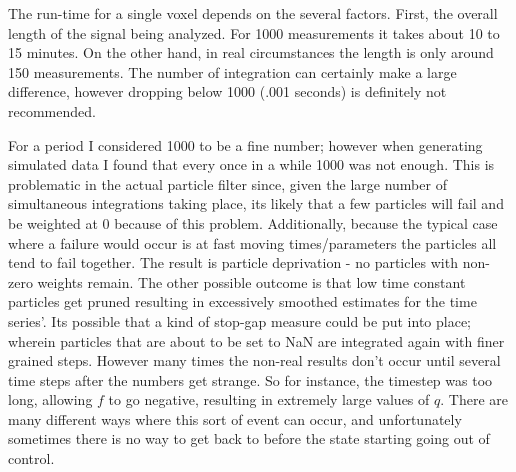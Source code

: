 The run-time for a single voxel depends on the several factors. First, the
overall length of the signal being analyzed. For 1000 measurements it takes
about 10 to 15 minutes. On the other hand, in real circumstances the
length is only around 150 measurements. The number of  integration
can certainly make a large difference, however dropping below 1000 (.001 seconds)
is definitely not recommended. 

For a period I considered 1000 to be a
fine number; however when generating simulated data I found that every once
in a while 1000 was not enough. This is problematic in the actual particle
filter since, given the large number of simultaneous integrations taking 
place, its likely that a few particles will fail and be weighted at 0 because
of this problem. Additionally, because the typical case where a failure would
occur is at fast moving times/parameters the particles all tend to fail together.
The result is particle deprivation - no particles with non-zero weights remain.
The other possible outcome is that low time constant particles get pruned resulting
in excessively smoothed estimates for the time series'. Its possible that a
kind of stop-gap measure could be put into place; wherein particles that are
about to be set to NaN are integrated again with finer grained steps. However
many times the non-real results don't occur until several time steps after the 
numbers get strange. So for instance, the timestep was too long, allowing 
$f$ to go negative, resulting in extremely large values of $q$. There are many
different ways where this sort of event can occur, and unfortunately sometimes
there is no way to get back to before the state starting going out of control.

